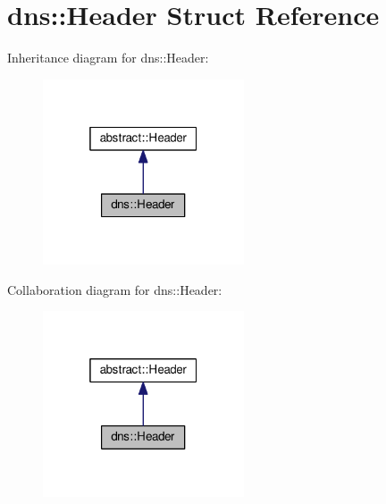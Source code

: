 \hypertarget{structdns_1_1Header}{}\section{dns\+:\+:Header Struct Reference}
\label{structdns_1_1Header}


Inheritance diagram for dns\+:\+:Header\+:\nopagebreak
\begin{figure}[H]
\begin{center}
\leavevmode
\includegraphics[width=169pt]{structdns_1_1Header__inherit__graph}
\end{center}
\end{figure}


Collaboration diagram for dns\+:\+:Header\+:\nopagebreak
\begin{figure}[H]
\begin{center}
\leavevmode
\includegraphics[width=169pt]{structdns_1_1Header__coll__graph}
\end{center}
\end{figure}
